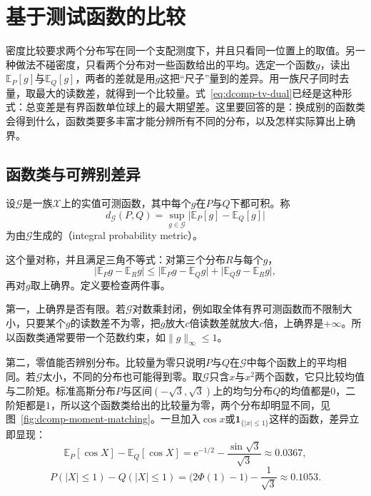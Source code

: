 \section{基于测试函数的比较}
\label{sec:dcomp-ipm}

密度比较要求两个分布写在同一个支配测度下，并且只看同一位置上的取值。另一种做法不碰密度，只看两个分布对一些函数给出的平均。选定一个函数$g$，读出$\mathbb{E}_{P}[g]$与$\mathbb{E}_{Q}[g]$，两者的差就是用$g$这把“尺子”量到的差异。用一族尺子同时去量，取最大的读数差，就得到一个比较量。式~\eqref{eq:dcomp-tv-dual}已经是这种形式：总变差是有界函数单位球上的最大期望差。这里要回答的是：换成别的函数类会得到什么，函数类要多丰富才能分辨所有不同的分布，以及怎样实际算出上确界。

\subsection{函数类与可辨别差异}
\label{sec:dcomp-ipm-classes}

\begin{definition}[积分概率度量]
\label{def:dcomp-ipm}
设$\mathcal{G}$是一族$\mathcal{X}$上的实值可测函数，其中每个$g$在$P$与$Q$下都可积。称
\begin{equation}
 d_{\mathcal{G}}(P,Q)=\sup_{g\in\mathcal{G}}\bigl\lvert\mathbb{E}_{P}[g]-\mathbb{E}_{Q}[g]\bigr\rvert
 \label{eq:dcomp-ipm-def}
\end{equation}
为由$\mathcal{G}$生成的（integral probability metric）。
\end{definition}

这个量对称，并且满足三角不等式：对第三个分布$R$与每个$g$，
\[
 \lvert\mathbb{E}_{P}g-\mathbb{E}_{R}g\rvert\leq\lvert\mathbb{E}_{P}g-\mathbb{E}_{Q}g\rvert+\lvert\mathbb{E}_{Q}g-\mathbb{E}_{R}g\rvert ,
\]
再对$g$取上确界。定义要检查两件事。

第一，上确界是否有限。若$\mathcal{G}$对数乘封闭，例如取全体有界可测函数而不限制大小，只要某个$g$的读数差不为零，把$g$放大$c$倍读数差就放大$c$倍，上确界是$+\infty$。所以函数类通常要带一个范数约束，如$\lVert g\rVert_{\infty}\leq1$。

第二，零值能否辨别分布。比较量为零只说明$P$与$Q$在$\mathcal{G}$中每个函数上的平均相同。若$\mathcal{G}$太小，不同的分布也可能得到零。取$\mathcal{G}$只含$x$与$x^{2}$两个函数，它只比较均值与二阶矩。标准高斯分布$P$与区间$(-\sqrt3,\sqrt3)$上的均匀分布$Q$的均值都是$0$，二阶矩都是$1$，所以这个函数类给出的比较量为零，两个分布却明显不同，见图~\ref{fig:dcomp-moment-matching}。一旦加入$\cos x$或$\mathbf{1}_{\{\lvert x\rvert\leq1\}}$这样的函数，差异立即显现：
\[
 \mathbb{E}_{P}[\cos X]-\mathbb{E}_{Q}[\cos X]=\mathrm{e}^{-1/2}-\frac{\sin\sqrt3}{\sqrt3}\approx0.0367,
\]
\[
 P(\lvert X\rvert\leq1)-Q(\lvert X\rvert\leq1)=\bigl(2\Phi(1)-1\bigr)-\frac{1}{\sqrt3}\approx0.1053 .
\]

